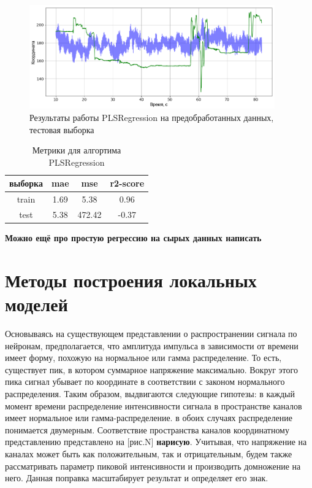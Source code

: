 \documentclass{mipt-thesis-bs}
\begin{document}
\begin{figure}
\begin{center}
	\includegraphics[width=300pt,height=\textheight,keepaspectratio]{imgs/motrenko-test.png}
	\caption{Результаты работы PLSRegression на предобработанных данных, тестовая выборка}	
	\label{fig:motr test}
	\end{center}
\end{figure}


\begin{table}[h]
  
  \centering
    \begin{tabular}{ | c | c | c | c | }
	\hline
	выборка &mae & mse & r2-score \\ \hline
	train &1.69 & 5.38 & 0.96 \\
	test & 5.38 & 472.42& -0.37\\
	\hline
	\end{tabular}
\caption{Метрики для алгортима PLSRegression}
\label{table:motrenko}
\end{table}

\textbf{Можно ещё про простую регрессию  на сырых данных написать}

\section{Методы построения локальных моделей}
Основываясь на существующем представлении о распространении сигнала по нейронам, предполагается, что амплитуда импульса в зависимости от времени имеет форму, похожую на нормальное или гамма распределение. То есть, существует пик, в котором суммарное напряжение максимально. Вокруг этого пика сигнал убывает по координате в соответствии с законом нормального распределения. Таким образом, выдвигаются следующие гипотезы: в каждый момент времени распределение интенсивности сигнала в пространстве каналов имеет нормальное или гамма-распределение. в обоих случаях распределение понимается двумерным. Соответствие пространства каналов координатному представлению представлено на [рис.N] \textbf{нарисую}. Учитывая, что напряжение на каналах может быть как положительным, так и отрицательным, будем также рассматривать параметр пиковой интенсивности и производить домножение на него. Данная поправка масштабирует результат и определяет его знак. 
\end{document}
